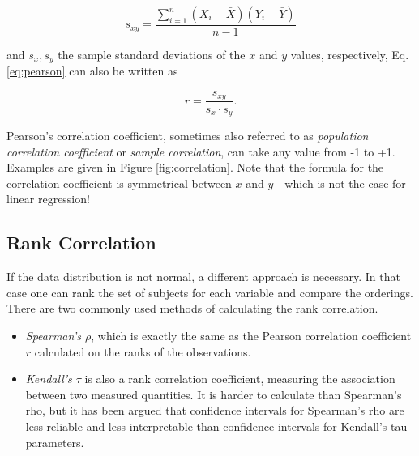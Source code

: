 \begin{equation}
  s_{xy} = \frac{\sum\limits_{i=1}^n (X_i - \bar{X})(Y_i - \bar{Y})}{n-1}
\end{equation}

and $s_x, s_y$ the sample standard deviations of the $x$ and $y$ values, respectively,  Eq. \ref{eq:pearson} can also be written as

\begin{equation}
  r = \frac{s_{xy}}{s_x \cdot s_y}.
\end{equation}

Pearson's correlation coefficient, sometimes also referred to as \emph{population correlation coefficient} or \emph{sample correlation}, can take any value from -1 to +1. Examples are given in Figure \ref{fig:correlation}. Note that the formula for the correlation coefficient is symmetrical between $x$ and $y$ - which is not the case for linear regression!

\subsection{Rank Correlation}

If the data distribution is not normal, a different approach is necessary. In that case one can rank the set of subjects for each variable and compare the orderings. There are two commonly used methods of calculating the rank correlation. 

\begin{itemize}
  \item   \emph{Spearman's $\rho$}, which is exactly the same as the Pearson correlation coefficient $r$ calculated on the ranks of the observations.
  \item   \emph{Kendall's $\tau$} is also a rank correlation coefficient, measuring the association between two measured quantities. It is harder to calculate than Spearman's rho, but it has been argued that confidence intervals for Spearman’s rho are less reliable and less interpretable than confidence intervals for Kendall’s tau-parameters.
\end{itemize}


